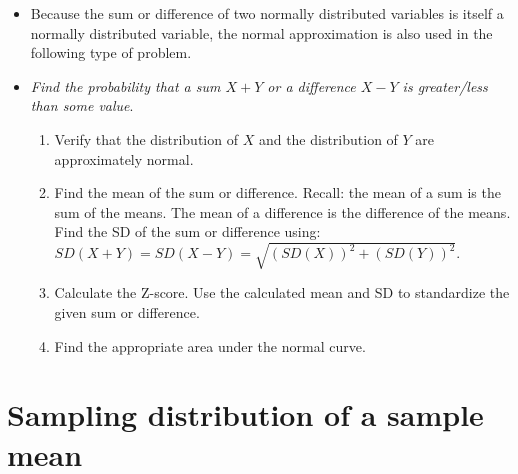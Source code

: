 \begin{itemize}
\item Because the sum or difference of two normally distributed variables is itself a normally distributed variable, the normal approximation is also used in the following type of problem.
\item[] \textit{Find the probability that a sum $X+Y$ or a difference $X-Y$ is greater/less than some value}.
\begin{enumerate}\vspace{-1mm}
\setlength{\itemsep}{0mm}
\item Verify that the distribution of $X$ and the distribution of $Y$ are approximately normal.  
\item Find the mean of the sum or difference.  Recall: the mean of a sum is the 
\\sum of the means.  The mean of a difference is the difference of the means.  
\\Find the SD of the sum or difference using:  
\\$SD(X+Y) = SD(X - Y) =  \sqrt{(SD(X))^2 + (SD(Y))^2}$.
\item Calculate the Z-score.  Use the calculated mean and SD to standardize the given sum or difference.
\item Find the appropriate area under the normal curve. 
\end{enumerate}


\end{itemize}

{}


\section[Sampling distribution of a sample mean]{Sampling distribution of a sample mean }
\label{distributionofxbar}

